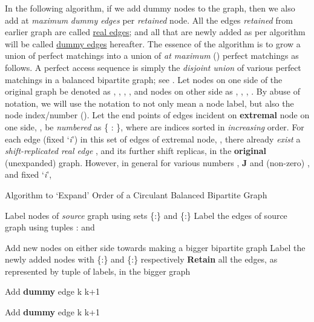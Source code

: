 \documentclass[12pt]{article}
\begin{document}
In the following algorithm, if we add  dummy nodes to the graph,
then we also add at \textit{maximum}  \textit{dummy edges} per
\textit{retained} node. All the edges \textit{retained} from
earlier graph are called \uline{real edges}; and all that are newly added
as per algorithm will be called \uline{dummy edges} hereafter. The essence of the algorithm is to grow a union of 
perfect matchings into a union of \textit{at maximum} ()
perfect matchings as follows. A perfect access sequence is simply the
\textit{disjoint union} of various perfect matchings in a balanced bipartite
graph; see \cite{fold2_techrep}. Let nodes on one side of the original
graph be denoted as , , , , and nodes
on other side as , , , . By
abuse of notation, we will use the notation  to not only mean a node
label, but also the node index/number ().  Let the end
points of edges incident on \textbf{extremal} node on one
side, , be \textit{numbered} as \{ :
\}, where  are indices sorted in
\textit{increasing} order.  For each edge (fixed `\textit{i}') in
this set of edges of extremal node, ,
there already \textit{exist} a \textit{shift-replicated} \textit{real edge} , and its further shift
replicas, in the \textbf{original} (unexpanded) graph. However, in general
for various numbers , \textbf{J} and
(non-zero) , and fixed `\textit{i}',


\begin{algorithm}[!h]
\caption{Algorithm to `Expand' Order of a Circulant Balanced Bipartite Graph}
\label{prime_algo}
\begin{algorithmic}[1]
\algrenewcommand{}
   \State Label nodes of \textit{source} graph using sets \{:\}
   and \{:\}
    \State Label the edges of source graph using tuples :
     and 

    \Statex
    \State Add  new nodes on either side towards making a bigger
    bipartite graph
    \State Label the newly added nodes with \{:\} and \{:\} respectively
    \State \textbf{Retain} all the edges, as represented by tuple of labels, in the
    bigger graph
    \Statex

      \While{}
          \State Add \textbf{dummy} edge \alpha\alpha
        \EndIf
      \Statex
      \State k  k+1
      \EndWhile
    \EndFor

    \Statex

      \While{}
          \State Add \textbf{dummy} edge \alpha
        \EndIf
      \Statex
      \State k  k+1
      \EndWhile
    \EndFor
\end{algorithmic}
\end{algorithm}
\end{document}
